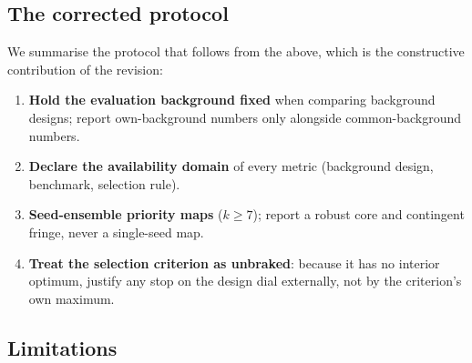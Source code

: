 \documentclass[12pt]{article}
\begin{document}
\subsection{The corrected protocol}

We summarise the protocol that follows from the above, which is the constructive contribution of the revision:

\begin{enumerate}
  \item \textbf{Hold the evaluation background fixed} when comparing background designs; report own-background numbers only alongside common-background numbers.
  \item \textbf{Declare the availability domain} of every metric (background design, benchmark, selection rule).
  \item \textbf{Seed-ensemble priority maps} ($k \geq 7$); report a robust core and contingent fringe, never a single-seed map.
  \item \textbf{Treat the selection criterion as unbraked}: because it has no interior optimum, justify any stop on the design dial externally, not by the criterion's own maximum.
\end{enumerate}

\subsection{Limitations}
\label{sec:limitations}
\end{document}
